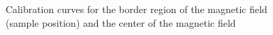 \documentclass[a4paper,10pt]{scrartcl}
\begin{document}
\begin{figure}
\centering
{}
\caption{Calibration curves for the border region of the magnetic field (sample position)  and the center of the magnetic field  \label{fig:calib}}
\end{figure}
\end{document}
